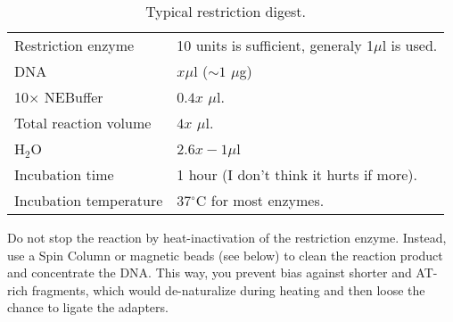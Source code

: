 \documentclass[a4paper,12pt]{article}
\begin{document}
\begin{table}
\begin{center}
\caption{Typical restriction digest.}\label{tau:digest}
\vspace{0.3cm}
\begin{tabular}{ll}
\toprule
Restriction enzyme&10 units is sufficient, generaly 1$\mu$l is used.\\
DNA&$x \mu$l ($\sim1$ $\mu$g)\\
10$\times$ NEBuffer& $0.4x$ $\mu$l.\\
Total reaction volume&$4x$ $\mu$l.\\
H$_2$O&$2.6x - 1 \mu$l\\
Incubation time&1 hour (I don't think it hurts if more).\\
Incubation temperature&37$^{\circ}$C for most enzymes.\\
\bottomrule
\end{tabular}
\end{center}
\end{table}

Do not stop the reaction by heat-inactivation of the restriction enzyme. Instead, use a Spin Column or magnetic beads (see below) to clean the reaction product and concentrate the DNA. This way, you prevent bias against shorter and AT-rich fragments, which would de-naturalize during heating and then loose the chance to ligate the adapters.
\end{document}
